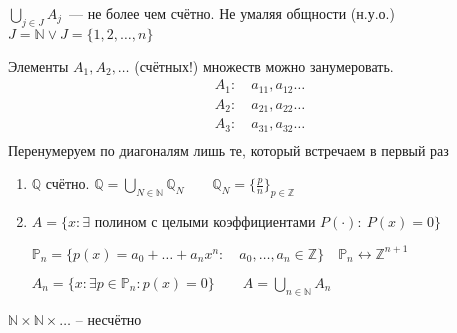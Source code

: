 \documentclass{book}
\newcommand\N{\ensuremath{\mathbb{N}}}
\newcommand\Z{\ensuremath{\mathbb{Z}}}
\newcommand\Q{\ensuremath{\mathbb{Q}}}
\theoremstyle{definition}
\begin{document}
        $\bigcup\limits_{j\in J} A_j$~--- не более чем счётно.
        Не умаляя общности (н.у.о.)\\
        $J = \N \vee J = \{1, 2, \ldots, n\}$

        Элементы $A_1, A_2, \ldots$ (счётных!) множеств можно занумеровать.
        \begin{align*}
            A_1:\quad a_{11}, a_{12} \ldots\\
            A_2:\quad a_{21}, a_{22} \ldots\\
            A_3:\quad a_{31}, a_{32} \ldots\\
        \end{align*}
        Перенумеруем по диагоналям лишь те, который встречаем в первый раз

    \begin{corollary}
        \begin{enumerate}
            \item 
            $\Q$ счётно. 
            $\Q = \bigcup\limits_{N\in \N } \Q_N\qquad \Q_N = \{\frac{p}{n}\}_{p\in \Z }$
            \item $A = \{x: \exists \text{ полином с целыми коэффициентами } P(\cdot):\ P(x) = 0\}$

            $\mathds{P}_n = \{p(x) = a_0 + \ldots + a_nx^n:\quad a_0, \ldots, a_n\in \Z \}\quad \mathds{P}_n \leftrightarrow \Z ^{n+1}$

            $A_n = \{x:\exists p\in \mathds{P}_n: p(x) = 0\}\qquad A = \bigcup\limits_{n\in \N } A_n$
        \end{enumerate}

    \end{corollary}

    \begin{problem}
        $\N \times \N \times \ldots$ -- несчётно
    \end{problem}
\end{document}
